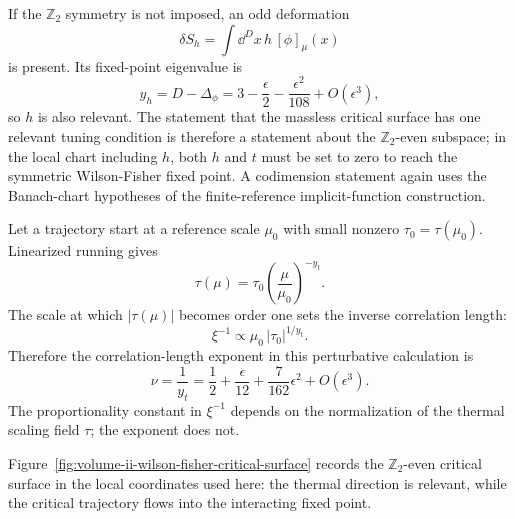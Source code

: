 If the \(\mathbb Z_2\) symmetry is not imposed, an odd deformation
\[
  \delta S_h
  =
  \int \dd^D x\,h\,[\phi]_\mu(x)
\]
is present.  Its fixed-point eigenvalue is
\[
  y_h
  =
  D-\Delta_\phi
  =
  3-\frac{\epsilon}{2}
  -\frac{\epsilon^2}{108}
  +O(\epsilon^3),
\]
so \(h\) is also relevant.  The statement that the massless critical surface
has one relevant tuning condition is therefore a statement about the
\(\mathbb Z_2\)-even subspace; in the local chart including \(h\), both
\(h\) and \(t\) must be set to zero to reach the symmetric Wilson-Fisher
fixed point.  A codimension statement again uses the Banach-chart hypotheses
of the finite-reference implicit-function construction.

Let a trajectory start at a reference scale \(\mu_0\) with small nonzero
\(\tau_0=\tau(\mu_0)\).  Linearized running gives
\[
  \tau(\mu)
  =
  \tau_0\left(\frac{\mu}{\mu_0}\right)^{-y_t}.
\]
The scale at which \(|\tau(\mu)|\) becomes order one sets the inverse
correlation length:
\[
  \xi^{-1}
  \propto
  \mu_0\,|\tau_0|^{1/y_t}.
\]
Therefore the correlation-length exponent in this perturbative calculation is
\[
  \nu=\frac1{y_t}
  =
  \frac12+\frac{\epsilon}{12}
  +\frac{7}{162}\epsilon^2
  +O(\epsilon^3).
\]
The proportionality constant in \(\xi^{-1}\) depends on the normalization of
the thermal scaling field \(\tau\); the exponent does not.

Figure~\ref{fig:volume-ii-wilson-fisher-critical-surface} records the
\(\mathbb Z_2\)-even critical surface in the local coordinates used here: the
thermal direction is relevant, while the critical trajectory flows into the
interacting fixed point.

